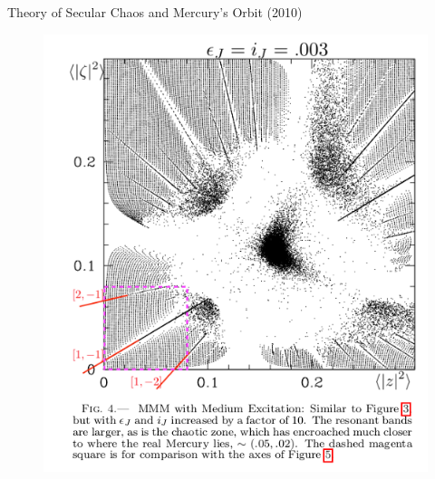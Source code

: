 \documentclass{beamer}
\begin{document}
\begin{frame}{Theory of Secular Chaos and Mercury's Orbit (2010)}
\begin{figure}[h]
\begin{minipage}[h]{0.65\linewidth}
\includegraphics[width=1\linewidth]{./10_2.png}
\end{minipage}
\end{figure}
\end{frame}
\end{document}
